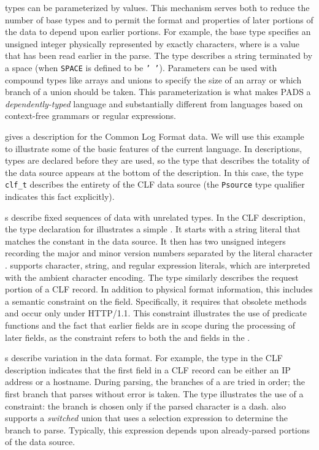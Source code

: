 \documentclass[10pt]{article}
\begin{document}
\pads{} types can be parameterized by values.  This mechanism serves
both to reduce the number of base types and to permit the format and
properties of later portions of the data to depend upon earlier
portions.  For example, the base type  specifies
an unsigned integer physically represented by exactly 
characters, where  is a value that has been read earlier in the
parse.  The type  describes a string
terminated by a space (when \texttt{SPACE} is defined to be \texttt{' '}).  
Parameters can be used with compound types like arrays and unions to
specify the size of an array or which branch of a union should be
taken.  This parameterization is what makes PADS a {\em dependently-typed}
language and substantially different from languages based on
context-free grammars or regular expressions.

 gives a \pads{} description for the Common Log Format
data.  
We will use this example to illustrate some of the basic
features of the current \pads{} language.  
In \pads{} descriptions, types are declared before they are used, 
so the type that describes the totality of the data source appears 
at the bottom of the description.  
In this case,
the type \texttt{clf\_t}  describes the entirety of the
CLF data source (the \texttt{Psource} type qualifier indicates
this fact explicitly).  

s describe fixed sequences of data with unrelated types.
In the CLF description, the type declaration for
 illustrates a simple . It starts with a 
string literal that matches the constant  in the data source.  It 
then has two unsigned integers recording the major and minor version numbers
separated by the literal character .  \pads{} supports character, string,
and regular expression literals, which are interpreted with the ambient character 
encoding. The type  
similarly describes the request portion of a CLF record.  In addition
to physical format information, this  includes a semantic constraint
on the  field.  Specifically, it requires that obsolete methods
 and  occur only under HTTP/1.1.  This constraint illustrates
the use of predicate functions and the fact 
that earlier fields are in scope during the processing of later fields, as the 
constraint
refers to both the  and  fields in the .

s describe variation in the data format.  For example, the
 type in the CLF description indicates that the first
field in a CLF record can be either an IP address or a hostname.
During parsing, the branches of a  are tried in order; the
first branch that parses without error is taken.  The 
type illustrates the use of a constraint: the branch 
is chosen only if the parsed character is a dash.  \pads{} also
supports a \textit{switched} union that uses a selection expression to
determine the branch to parse.  Typically, this expression depends
upon already-parsed portions of the data source.
\end{document}

